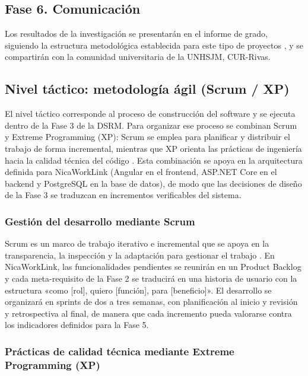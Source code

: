 \subsection{Fase 6. Comunicación}

Los resultados de la investigación se presentarán en el informe de grado, siguiendo la estructura metodológica establecida para este tipo de proyectos \parencite{departamentociencias2023}, y se compartirán con la comunidad universitaria de la UNHSJM, CUR-Rivas.

\subsection{Nivel táctico: metodología ágil (Scrum / XP)}

El nivel táctico corresponde al proceso de construcción del software y se ejecuta dentro de la Fase 3 de la DSRM. Para organizar ese proceso se combinan Scrum y Extreme Programming (XP): Scrum se emplea para planificar y distribuir el trabajo de forma incremental, mientras que XP orienta las prácticas de ingeniería hacia la calidad técnica del código \parencite{beck2000,schwaber2020}. Esta combinación se apoya en la arquitectura definida para NicaWorkLink (Angular en el frontend, ASP.NET Core en el backend y PostgreSQL en la base de datos), de modo que las decisiones de diseño de la Fase 3 se traduzcan en incrementos verificables del sistema.

\subsubsection{Gestión del desarrollo mediante Scrum}

Scrum es un marco de trabajo iterativo e incremental que se apoya en la transparencia, la inspección y la adaptación para gestionar el trabajo \parencite{schwaber2020}. En NicaWorkLink, las funcionalidades pendientes se reunirán en un Product Backlog y cada meta-requisito de la Fase 2 se traducirá en una historia de usuario con la estructura «como [rol], quiero [función], para [beneficio]». El desarrollo se organizará en sprints de dos a tres semanas, con planificación al inicio y revisión y retrospectiva al final, de manera que cada incremento pueda valorarse contra los indicadores definidos para la Fase 5.

\subsubsection{Prácticas de calidad técnica mediante Extreme Programming (XP)}

